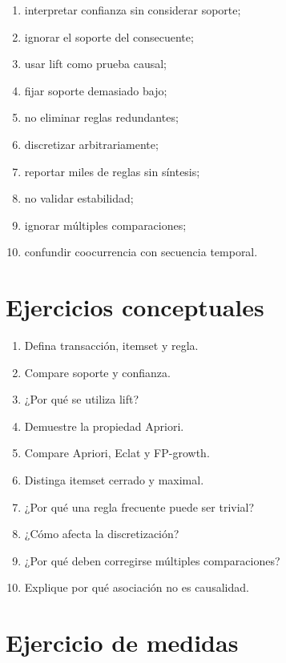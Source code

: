 \documentclass[
  spanish,
  10.5pt,
  letterpaper,
  DIV=11,
  numbers=noendperiod,
  oneside,
  open=any]{scrreprt}
\providecommand{\tightlist}{%
  \setlength{\itemsep}{0pt}\setlength{\parskip}{0pt}}
\theoremstyle{definition}
\theoremstyle{definition}
\theoremstyle{plain}
\theoremstyle{remark}
\begin{document}
\begin{enumerate}
\def\labelenumi{\arabic{enumi}.}
\tightlist
\item
  interpretar confianza sin considerar soporte;
\item
  ignorar el soporte del consecuente;
\item
  usar lift como prueba causal;
\item
  fijar soporte demasiado bajo;
\item
  no eliminar reglas redundantes;
\item
  discretizar arbitrariamente;
\item
  reportar miles de reglas sin síntesis;
\item
  no validar estabilidad;
\item
  ignorar múltiples comparaciones;
\item
  confundir coocurrencia con secuencia temporal.
\end{enumerate}

\section*{Ejercicios conceptuales}\label{ejercicios-conceptuales-18}


\begin{enumerate}
\def\labelenumi{\arabic{enumi}.}
\tightlist
\item
  Defina transacción, itemset y regla.
\item
  Compare soporte y confianza.
\item
  ¿Por qué se utiliza lift?
\item
  Demuestre la propiedad Apriori.
\item
  Compare Apriori, Eclat y FP-growth.
\item
  Distinga itemset cerrado y maximal.
\item
  ¿Por qué una regla frecuente puede ser trivial?
\item
  ¿Cómo afecta la discretización?
\item
  ¿Por qué deben corregirse múltiples comparaciones?
\item
  Explique por qué asociación no es causalidad.
\end{enumerate}

\section*{Ejercicio de medidas}\label{ejercicio-de-medidas}
\end{document}
